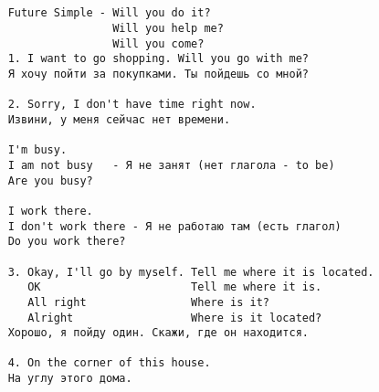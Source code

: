 \subsection*{}
\begin{verbatim}
    Future Simple - Will you do it?
                    Will you help me?
                    Will you come?
    1. I want to go shopping. Will you go with me?
    Я хочу пойти за покупками. Ты пойдешь со мной?

    2. Sorry, I don't have time right now.
    Извини, у меня сейчас нет времени.

    I'm busy.
    I am not busy   - Я не занят (нет глагола - to be)
    Are you busy?

    I work there.
    I don't work there - Я не работаю там (есть глагол)
    Do you work there?

    3. Okay, I'll go by myself. Tell me where it is located.
       OK                       Tell me where it is.
       All right                Where is it?
       Alright                  Where is it located?
    Хорошо, я пойду один. Скажи, где он находится.

    4. On the corner of this house.
    На углу этого дома.
\end{verbatim}